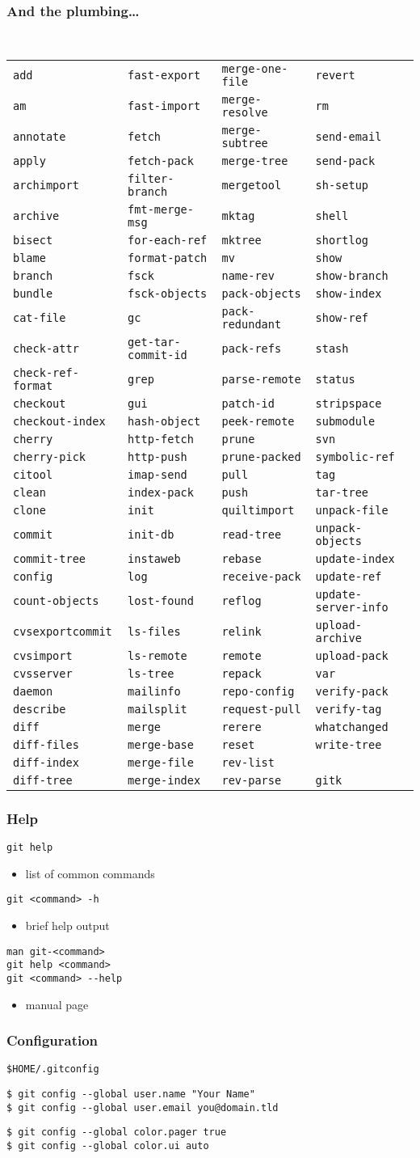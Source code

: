 \documentclass[english]{beamer}
\newcommand{\CMD}[1]{%
\texttt{\textcolor{code-green}{#1}}%
}
\newcommand{\cmd}[1]{%
\texttt{\textcolor{code-orange}{#1}}%
}
\newcommand{\gui}[1]{%
\texttt{\textcolor{code-blue}{#1}}%
}
\newcommand{\fnt}[1]{%
\texttt{\textcolor{code-gray}{#1}}%
}
\newcommand{\GitCmdTable}[4]{
{\tiny \tt
\begin{tabular}{llll}
#2{add}              & #4{fast-export}       & #4{merge-one-file} & #3{revert}             \\
#3{am}               & #4{fast-import}       & #4{merge-resolve}  & #2{rm}                 \\
#3{annotate}         & #2{fetch}             & #4{merge-subtree}  & #3{send-email}         \\
#3{apply}            & #4{fetch-pack}        & #4{merge-tree}     & #4{send-pack}          \\
#4{archimport}       & #4{filter-branch}     & #1{mergetool}      & #4{sh-setup}           \\
#3{archive}          & #4{fmt-merge-msg}     & #4{mktag}          & #1{shell}              \\
#3{bisect}           & #4{for-each-ref}      & #4{mktree}         & #3{shortlog}           \\
#3{blame}            & #3{format-patch}      & #2{mv}             & #2{show}               \\
#2{branch}           & #4{fsck}              & #4{name-rev}       & #3{show-branch}        \\
#3{bundle}           & #4{fsck-objects}      & #4{pack-objects}   & #4{show-index}         \\
#4{cat-file}         & #2{gc}                & #4{pack-redundant} & #4{show-ref}           \\
#4{check-attr}       & #4{get-tar-commit-id} & #4{pack-refs}      & #2{stash}              \\
#4{check-ref-format} & #2{grep}              & #4{parse-remote}   & #2{status}             \\
#2{checkout}         & #1{gui}               & #4{patch-id}       & #4{stripspace}         \\
#4{checkout-index}   & #4{hash-object}       & #4{peek-remote}    & #3{submodule}          \\
#3{cherry}           & #4{http-fetch}        & #4{prune}          & #3{svn}                \\
#3{cherry-pick}      & #4{http-push}         & #4{prune-packed}   & #4{symbolic-ref}       \\
#1{citool}           & #4{imap-send}         & #2{pull}           & #2{tag}                \\
#3{clean}            & #4{index-pack}        & #2{push}           & #4{tar-tree}           \\
#2{clone}            & #2{init}              & #3{quiltimport}    & #4{unpack-file}        \\
#2{commit}           & #4{init-db}           & #4{read-tree}      & #4{unpack-objects}     \\
#4{commit-tree}      & #3{instaweb}          & #2{rebase}         & #4{update-index}       \\
#2{config}           & #2{log}               & #4{receive-pack}   & #4{update-ref}         \\
#4{count-objects}    & #4{lost-found}        & #3{reflog}         & #3{update-server-info} \\
#4{cvsexportcommit}  & #4{ls-files}          & #4{relink}         & #4{upload-archive}     \\
#4{cvsimport}        & #4{ls-remote}         & #2{remote}         & #4{upload-pack}        \\
#4{cvsserver}        & #4{ls-tree}           & #4{repack}         & #4{var}                \\
#4{daemon}           & #4{mailinfo}          & #4{repo-config}    & #4{verify-pack}        \\
#3{describe}         & #4{mailsplit}         & #4{request-pull}   & #4{verify-tag}         \\
#2{diff}             & #2{merge}             & #4{rerere}         & #3{whatchanged}        \\
#4{diff-files}       & #4{merge-base}        & #2{reset}          & #4{write-tree}         \\
#4{diff-index}       & #4{merge-file}        & #4{rev-list}       &                        \\
#4{diff-tree}        & #4{merge-index}       & #4{rev-parse}      & #1{gitk}               \\
\end{tabular}
}}
\begin{document}
\begin{frame}[fragile]
\frametitle{And the plumbing\ldots}
\GitCmdTable{\gui}{\CMD}{\cmd}{\fnt}
\end{frame}

\begin{frame}
\frametitle{Help}

\CMD{git help}
\begin{itemize}
        \item list of common commands
\end{itemize}

\pause{}
\vspace{.1\textheight}

\CMD{git <command> -h}
\begin{itemize}
        \item brief help output
\end{itemize}

\pause{}
\vspace{.1\textheight}

\CMD{man git-<command>} \\
\CMD{git help <command>} \\
\CMD{git <command> {-}-help} \\
\begin{itemize}
        \item manual page
\end{itemize}

\end{frame}

\begin{frame}
\frametitle{Configuration}

\CMD{\$HOME/.gitconfig}

\pause{}
\vspace{.1\textheight}

\CMD{\$ git config {-}-global user.name "Your Name"} \\
\CMD{\$ git config {-}-global user.email you@domain.tld}

\pause{}
\vspace{.1\textheight}

\CMD{\$ git config {-}-global color.pager true} \\
\CMD{\$ git config {-}-global color.ui auto}

\end{frame}
\end{document}
